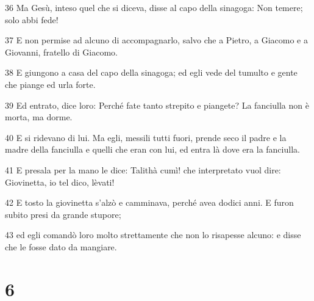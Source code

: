 \par 36 Ma Gesù, inteso quel che si diceva, disse al capo della sinagoga: Non temere; solo abbi fede!
\par 37 E non permise ad alcuno di accompagnarlo, salvo che a Pietro, a Giacomo e a Giovanni, fratello di Giacomo.
\par 38 E giungono a casa del capo della sinagoga; ed egli vede del tumulto e gente che piange ed urla forte.
\par 39 Ed entrato, dice loro: Perché fate tanto strepito e piangete? La fanciulla non è morta, ma dorme.
\par 40 E si ridevano di lui. Ma egli, messili tutti fuori, prende seco il padre e la madre della fanciulla e quelli che eran con lui, ed entra là dove era la fanciulla.
\par 41 E presala per la mano le dice: Talithà cumì! che interpretato vuol dire: Giovinetta, io tel dico, lèvati!
\par 42 E tosto la giovinetta s'alzò e camminava, perché avea dodici anni. E furon subito presi da grande stupore;
\par 43 ed egli comandò loro molto strettamente che non lo risapesse alcuno: e disse che le fosse dato da mangiare.

\chapter{6}

